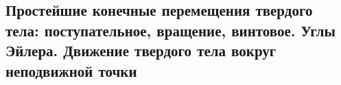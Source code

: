 

\subsection{Простейшие конечные перемещения твердого тела: поступательное, вращение, винтовое. Углы Эйлера. Движение твердого тела вокруг неподвижной точки}



